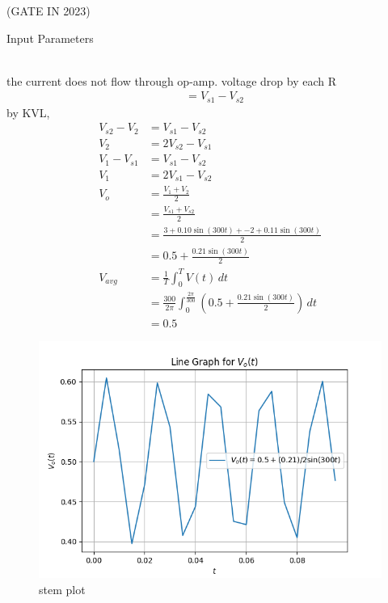 \documentclass[journal,12pt,twocolumn]{IEEEtran}
\theoremstyle{remark}
\begin{document}
\begin{figure}[ht]
\centering
\resizebox{0.55\columnwidth}{!}{}
\end{figure}
\hfill{(GATE IN 2023)}\\
\solution
\begin{table}[h!]
  \centering
  
  \caption{Input Parameters}
    \label{tab:table1}
\end{table}\\
the current does not flow through op-amp. voltage drop by each R
\begin{align}
&= V_{s1}-V_{s2}
\end{align}
by KVL,
\begin{align}
V_{s2}-V_2&=V_{s1}-V_{s2}\\
V_2&=2V_{s2}-V_{s1}\\
V_1-V_{s1}&=V_{s1}-V_{s2}\\
V_1&= 2V_{s1}-V_{s2}\\
V_o&= \frac{V_1+V_2}{2}\\
&=\frac{V_{s1}+V_{s2}}{2}\\
&=\frac{3+0.10\sin(300t)+{-2}+0.11\sin(300t)}{2}\\
&=0.5+ \frac{0.21\sin(300t)}{2}\\
V_{avg}&=\frac{1}{T} \int_{0}^{T} V(t) \,dt\\
&=\frac{300}{2\pi} \int_{0}^{\frac{2\pi}{300}} \left(0.5 + \frac{0.21 \sin(300t)}{2}\right) \, dt\\
&=0.5
\end{align}
\begin{figure}[b]
    \centering
    \includegraphics[width=\columnwidth]{59/figs/59fig.png}
    \caption{stem plot }
    \label{fig:1}
\end{figure}
\end{document}
